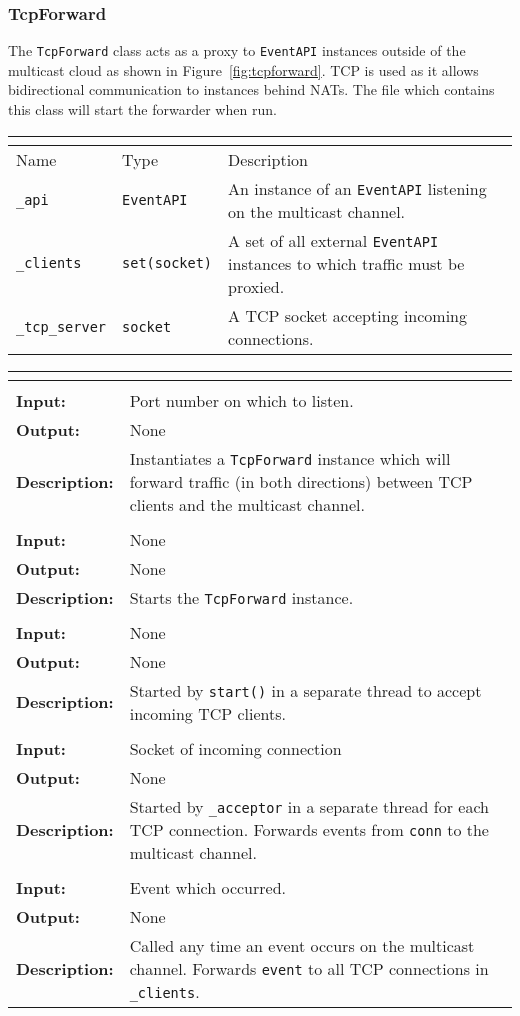 \documentclass[titlepage]{article}
\newcommand{\operations}[1]{
\begin{center}
    \begin{longtable}{|p{4cm}|p{10cm + 2.0\tabcolsep}|}
    \hline
    \multicolumn{2}{|l|}{\cellcolor[gray]{0.5}{\textbf{Operations}}} \\ \hline
#1
    \end{longtable}
\end{center}
}
\newcommand{\operation}[4]{
    \hline
    \multicolumn{2}{|l|}{\cellcolor[gray]{0.8}{\texttt{#1}}} \\ \hline
    \hspace{7pt}\textbf{Input:} & #2 \\ \hline
    \hspace{7pt}\textbf{Output:} & #3 \\ \hline
    \hspace{7pt}\textbf{Description:} & #4 \\ \hline
}
\newcommand{\attributes}[1]{
    \begin{center}
        \begin{tabular}{|p{3.5cm}|p{3.5cm}|p{7cm}|}
            \multicolumn{3}{|l|}{\cellcolor[gray]{0.5}{\textbf{Attributes}}} \\ \hline
            \rowcolor[gray]{0.8} Name & Type & Description \\ \hline 
            #1
        \end{tabular}
    \end{center}
}
\newcommand{\attribute}[3]{
    \texttt{#1} & \texttt{#2} & #3 \\ \hline
}
\begin{document}
\subsubsection{TcpForward}{The \texttt{TcpForward} class acts as a proxy to \texttt{EventAPI} instances outside of the multicast cloud as shown in Figure~\ref{fig:tcpforward}.  TCP is used as it allows bidirectional communication to instances behind NATs.  The file which contains this class will start the forwarder when run.}
\attributes
{
    \attribute{\_api}{EventAPI}{An instance of an \texttt{EventAPI} listening on the multicast channel.}
    \attribute{\_clients}{set(socket)}{A set of all external \texttt{EventAPI} instances to which traffic must be proxied.}
    \attribute{\_tcp\_server}{socket}{A TCP socket accepting incoming connections.}
}

\operations
{
    \operation{\_\_init\_\_(port)}{Port number on which to listen.}{None}{Instantiates a \texttt{TcpForward} instance which will forward traffic (in both directions) between TCP clients and the multicast channel.}
    \operation{start()}{None}{None}{Starts the \texttt{TcpForward} instance.}
    \operation{\_acceptor()}{None}{None}{Started by \texttt{start()} in a separate thread to accept incoming TCP clients.}
    \operation{\_listener(conn)}{Socket of incoming connection}{None}{Started by \texttt{\_acceptor} in a separate thread for each TCP connection.  Forwards events from \texttt{conn} to the multicast channel.}
    \operation{\_on\_event(event)}{Event which occurred.}{None}{Called any time an event occurs on the multicast channel.  Forwards \texttt{event} to all TCP connections in \texttt{\_clients}.}
}
\end{document}

